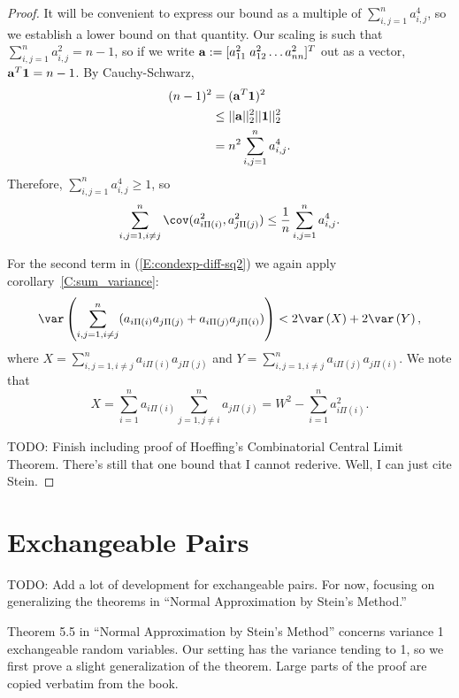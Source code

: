 \begin{theorem}
\begin{proof}
    It will be convenient to express our bound as a multiple of $\sum_{i,j=1}^n a_{i,j}^4$, so we
    establish a lower bound on that quantity.  Our scaling is such that $\sum_{i,j=1}^n a_{i,j}^2 =
    n-1$, so if we write ${\bf a} := [a_{11}^2 \; a_{12}^2 \ldots a_{nn}^2]^T$ out as a vector,
    ${\bf a}^T{\bf 1} = n-1$.  By Cauchy-Schwarz,
    \begin{align*}
      (n - 1)^2 &= ({\bf a}^T{\bf 1})^2 \\
      &\leq ||{\bf a}||_2^2 ||{\bf 1}||_2^2 \\
      &= n^2 \sum_{i,j=1}^n a_{i,j}^4.
    \end{align*}
    Therefore, $\sum_{i,j=1}^n a_{i,j}^4 \geq 1$, so
    \begin{equation}
      \sum_{i,j=1, i\neq j}^n \cov(a_{i \Pi(i)}^2, a_{j \Pi(j)}^2) \leq \frac{1}{n} \sum_{i,j=1}^n a_{i,j}^4.
    \end{equation}

    For the second term in (\ref{E:condexp-diff-sq2}) we again apply corollary~\ref{C:sum_variance}:
    \begin{equation*}
      \var \left ( \sum_{i,j=1, i\neq j}^n (a_{i\Pi(i)}a_{j\Pi(j)} + a_{i\Pi(j)}a_{j\Pi(i)}) \right )
      < 2 \var \left ( X \right ) +
      2 \var \left ( Y \right ),
    \end{equation*}
    where $X = \sum_{i,j=1, i\neq j}^n a_{i\Pi(i)}a_{j\Pi(j)}$ and $Y = \sum_{i,j=1, i\neq j}^n
    a_{i\Pi(j)}a_{j\Pi(i)}$.
    We note that
    \begin{equation}
      X = \sum_{i=1}^n a_{i\Pi(i)} \sum_{j=1, j\neq i}^n a_{j\Pi(j)} = W^2 - \sum_{i=1}^n a_{i\Pi(i)}^2.
    \end{equation}

    TODO: Finish including proof of Hoeffing's Combinatorial Central
    Limit Theorem.  There's still that one bound that I cannot
    rederive.  Well, I can just cite Stein.
  \end{proof}
\end{theorem}

\section{Exchangeable Pairs}
TODO: Add a lot of development for exchangeable pairs.  For now,
focusing on generalizing the theorems in ``Normal Approximation by
Stein's Method.'' \cite{chen2010normal}

Theorem 5.5 in ``Normal Approximation by Stein's Method'' concerns
variance 1 exchangeable random variables.  Our setting has the
variance tending to 1, so we first prove a slight generalization of
the theorem.  Large parts of the proof are copied verbatim from the
book.

